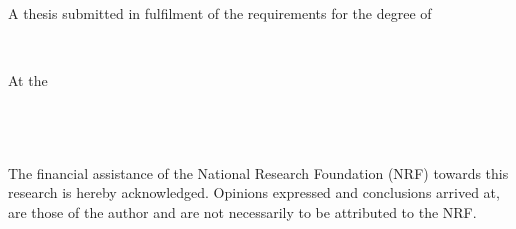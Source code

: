 \begin{titlepage}
\begin{addmargin}[0cm]{0cm}
\begin{center}
        

        \vspace{10mm}
        \small
        A thesis submitted in fulfilment of the requirements for the degree of

        \bigskip
        
        \begingroup
            \color{CMtitle}\myDegree \\
        \endgroup
        
        \bigskip

        At the \\
        \medskip
        \myFaculty \\
      
        \myDepartment \\
    
        \myUni \\ 
        
        \vspace{10mm}

        \begingroup
            \footnotesize The financial assistance of the National Research Foundation (NRF) towards this research is hereby acknowledged. Opinions expressed and conclusions arrived at, are those of the author and are not necessarily to be attributed to the NRF.
        \endgroup
        
        \bigskip

        \myTime%

        \vfill

    \end{center}
  \end{addmargin}
\end{titlepage}
